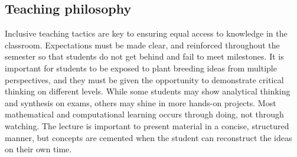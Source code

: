 \documentclass[11pt]{article}
\begin{document}



\subsection*{Teaching philosophy}

Inclusive teaching tactics are key to ensuring equal access to knowledge in the classroom. Expectations must be made clear, and reinforced throughout the semester so that students do not get behind and fail to meet milestones. It is important for students to be exposed to plant breeding ideas from multiple perspectives, and they must be given the opportunity to demonstrate critical thinking on different levels. While some students may show analytical thinking and synthesis on exams, others may shine in more hands-on projects. Most mathematical and computational learning occurs through doing, not through watching. The lecture is important to present material in a concise, structured manner, but concepts are cemented when the student can reconstruct the ideas on their own time.
\end{document}
